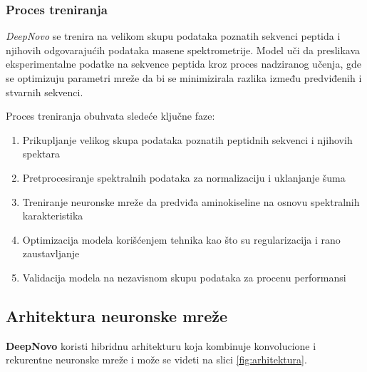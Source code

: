 \documentclass[12pt,oneside]{memoir}
\begin{document}
\subsubsection{Proces treniranja}
\emph{DeepNovo} se trenira na velikom skupu podataka poznatih sekvenci peptida i njihovih odgovarajućih podataka masene spektrometrije. Model uči da preslikava eksperimentalne podatke na sekvence peptida kroz proces nadziranog učenja, gde se optimizuju parametri mreže da bi se minimizirala razlika između predviđenih i stvarnih sekvenci.

Proces treniranja obuhvata sledeće ključne faze:

\begin{enumerate}
\item Prikupljanje velikog skupa podataka poznatih peptidnih sekvenci i njihovih spektara

\item Pretprocesiranje spektralnih podataka za normalizaciju i uklanjanje šuma

\item Treniranje neuronske mreže da predviđa aminokiseline na osnovu spektralnih karakteristika

\item Optimizacija modela korišćenjem tehnika kao što su regularizacija i rano zaustavljanje

\item Validacija modela na nezavisnom skupu podataka za procenu performansi
\end{enumerate}

\subsection{Arhitektura neuronske mreže}
\textbf{DeepNovo} koristi hibridnu arhitekturu koja kombinuje konvolucione i rekurentne neuronske mreže i može se videti na slici \ref{fig:arhitektura}.
\end{document}
